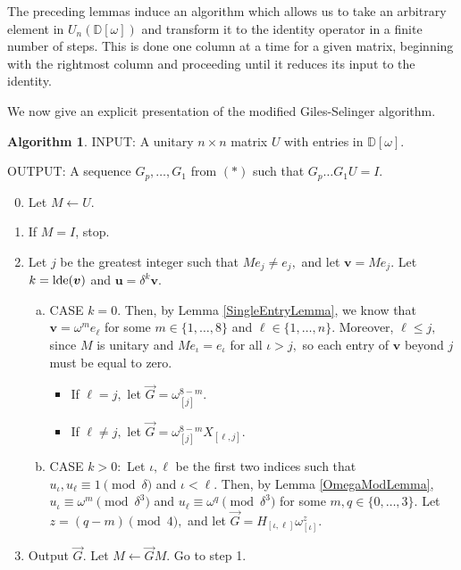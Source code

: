 \documentclass{dalthesis}
\theoremstyle{theorem}
\theoremstyle{definition}
\newtheorem{algorithm}[theorem]{Algorithm}
\theoremstyle{definition}  %
\theoremstyle{definition}
\newcommand{\D}{\mathbb{D}}
\newcommand{\jay}{j}
\renewcommand{\:}{\mathbin{:}}
\newcommand{\lde}{\mathop{\rm lde}\nolimits}
\renewcommand{\vec}{\overrightarrow}
\begin{document}
The preceding lemmas induce an algorithm which allows us to take an arbitrary element in $U_n(\D[\omega])$ and transform it to the identity operator in a finite number of steps. This is done one column at a time for a given matrix, beginning with the rightmost column and proceeding until it reduces its input to the identity. 

We now give an explicit presentation of the modified Giles-Selinger algorithm.

\begin{algorithm}
\label{GSAlg}
INPUT: A unitary $n\times n$ matrix $U$ with entries in $\D[\omega].$

OUTPUT: A sequence $G_p,\ldots ,G_1$ from $(*)$ such that $G_p\ldots G_1U = I.$

\begin{enumerate}\setcounter{enumi}{-1}
\item Let $M\leftarrow U$.
\item If $M = I$, stop.
\item Let $\jay$ be the greatest integer such that $Me_{\jay}\neq e_{\jay},$ and let $\boldsymbol{v} = Me_{\jay}.$ Let $k = \lde(\boldsymbol{v})$ and $\boldsymbol{u} = \delta^k\boldsymbol{v}.$
\begin{enumerate}[(a)]
\item CASE $k = 0.$ Then, by Lemma \ref{SingleEntryLemma}, we know that $\boldsymbol{v} = \omega^me_{\ell}$ for some $m\in\{1,\ldots ,8\}$ and $\ell\in\{1,\ldots ,n\}.$ Moreover, $\ell\leq\jay,$ since $M$ is unitary and $Me_{\iota} = e_{\iota}$ for all $\iota>\jay,$ so each entry of $\boldsymbol{v}$ beyond $\jay$ must be equal to zero.
\begin{itemize}
\item If $\ell = \jay,$ let $\vec{G} = \omega^{8-m}_{[\jay]}$.

\item If $\ell\neq\jay,$ let $\vec{G} = \omega^{8-m}_{[\jay]}X_{[\ell,\jay]}.$
\end{itemize}
\item CASE $k > 0:$ Let $\iota,\ell$ be the first two indices such that $u_\iota,u_\ell\equiv 1\pmod{\delta}$ and $\iota < \ell.$ Then, by Lemma \ref{OmegaModLemma}, $u_\iota\equiv\omega^m\pmod{\delta^3}$ and $u_\ell\equiv\omega^q\pmod{\delta^3}$ for some $m,q\in\{0,\ldots ,3\}.$ Let $z = (q - m)\pmod{4},$ and let $\vec{G} = H_{[\iota,\ell]}\omega^{z}_{[\iota]}.$
\end{enumerate}
\item Output $\vec{G}.$ Let $M\leftarrow\vec{G}M.$ Go to step 1.
\end{enumerate}
\end{algorithm}
\end{document}
